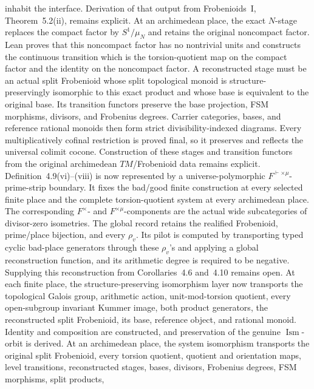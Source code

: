 \begin{definition}
  inhabit the interface.  Derivation of that output from Frobenioids~I,
  Theorem~5.2(ii), remains explicit.
  At an archimedean place, the exact \(N\)-stage replaces the compact factor by
  \(S^1/\mu_N\) and retains the original noncompact factor.  Lean proves that
  this noncompact factor has no nontrivial units and constructs the continuous
  transition which is the torsion-quotient map on the compact factor and the
  identity on the noncompact factor.  A reconstructed stage must be an actual
  split Frobenioid whose split topological monoid is structure-preservingly
  isomorphic to this exact product and whose base is equivalent to the original
  base.  Its transition functors preserve the base projection, FSM morphisms,
  divisors, and Frobenius degrees.  Carrier categories, bases, and reference
  rational monoids then form strict divisibility-indexed diagrams.  Every
  multiplicatively cofinal restriction is proved final, so it preserves and reflects the universal
  colimit cocone.  Construction of these stages and transition functors from
  the original archimedean \(TM\)/Frobenioid data remains explicit.
  Definition~4.9(vi)--(viii) is now represented by a universe-polymorphic
  \(F^{\vdash\times\mu}\)-prime-strip boundary.  It fixes the bad/good
  finite construction at every selected finite place and the complete
  torsion-quotient system at every archimedean place.  The corresponding
  \(F^\times\)- and \(F^{\times\mu}\)-components are the actual wide
  subcategories of divisor-zero isometries.  The global record retains the
  realified Frobenioid, prime/place bijection, and every \(\rho_v\).  Its pilot
  is computed by transporting typed cyclic bad-place generators through these
  \(\rho_v\)'s and applying a global reconstruction function, and its
  arithmetic degree is required to be negative.  Supplying this reconstruction
  from Corollaries~4.6 and~4.10 remains open.  At each finite place, the
  structure-preserving isomorphism layer now transports the topological Galois
  group, arithmetic action, unit-mod-torsion quotient, every open-subgroup
  invariant Kummer image, both product generators, the reconstructed split
  Frobenioid, its base, reference object, and rational monoid.  Identity and
  composition are constructed, and preservation of the genuine
  \(\operatorname{Ism}\)-orbit is derived.  At an archimedean place, the
  system isomorphism transports the original split Frobenioid, every torsion
  quotient, quotient and orientation maps, level transitions, reconstructed
  stages, bases, divisors, Frobenius degrees, FSM morphisms, split products,

\end{definition}
